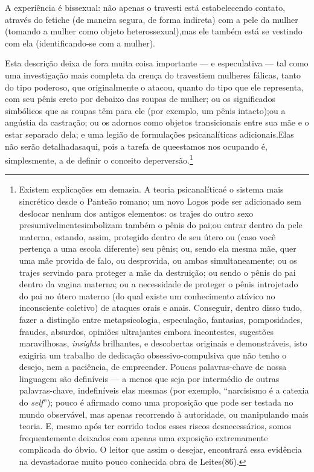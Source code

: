 A experiência é bissexual: não apenas o travesti está estabelecendo
contato, através do fetiche (de maneira segura, de forma indireta) com
a pele da mulher (tomando a mulher como objeto heterossexual),\idxheterotrav[|)] mas ele
também está se vestindo com ela (identificando-se com a mulher).

Esta descrição deixa de fora muita coisa importante --- e
especulativa --- tal como uma investigação mais completa da crença do
travesti\idxfetictrav[|)] em mulheres fálicas,\idxcastamulh{} tanto do tipo poderoso, que originalmente
o atacou, quanto do tipo que ele representa, com seu pênis ereto por
debaixo das roupas de mulher; ou os significados simbólicos que as
roupas têm para ele (por exemplo, um pênis intacto);\idxpenisfant[|)] ou a angústia da
castração; ou os adornos como objetos transicionais entre sua mãe e o
estar separado dela; e uma legião de formulações psicanalíticas
adicionais.\idxtravemsimb[|)] Elas não serão detalhadas\idxtravemsimb[|nn] aqui, pois a tarefa de que\idxtravempote[|)]
estamos nos ocupando é, simplesmente, a de definir o conceito de\idxmulhf[|)]
perversão.\footnote{ Existem explicações em demasia. A teoria
psicanalítica\idxpsica[|nn] é o sistema mais sincrético desde o Panteão romano; um
novo Logos pode ser adicionado sem deslocar nenhum dos antigos
elementos: os trajes do outro sexo presumivelmente\idxtravempote[|nn] simbolizam também o
pênis do pai;\idxpenisfant[|nn] ou entrar dentro da pele materna, estando, assim,
protegido dentro de seu útero ou (caso você pertença a uma escola
diferente) seu pênis; ou, sendo ela mesma mãe, quer uma mãe provida de
falo, ou desprovida, ou ambas simultaneamente; ou os trajes servindo
para proteger a mãe da destruição; ou sendo o pênis do pai dentro da
vagina materna; ou a necessidade de proteger o pênis introjetado do pai
no útero materno (do qual existe um conhecimento atávico no
inconsciente coletivo) de ataques orais e anais. Conseguir,
dentro disso tudo, fazer a distinção entre metapsicologia, especulação,
fantasias, pomposidades, fraudes, absurdos, opiniões ultrajantes embora
incontestes, sugestões maravilhosas, \emph{insights} brilhantes, e descobertas
originais e demonstráveis, isto exigiria um trabalho de dedicação
obsessivo-compulsiva que não tenho o desejo, nem a paciência, de
empreender. Poucas palavras-chave de nossa linguagem são definíveis
--- a menos que seja por intermédio de outras palavras-chave,
indefiníveis elas mesmas (por exemplo, ``narcisismo é a
catexia do \textit{self}''); pouco é afirmado como uma
proposição que pode ser testada no mundo observável, mas apenas
recorrendo à autoridade, ou manipulando mais teoria. E, mesmo após ter
corrido todos esses riscos desnecessários, somos frequentemente
deixados com apenas uma exposição extremamente complicada do óbvio. O
leitor que assim o desejar, encontrará essa evidência na devastadora\idxtravemcliv[|)]
e muito pouco conhecida obra de Leites\idxnatha[|nn] (86).}

